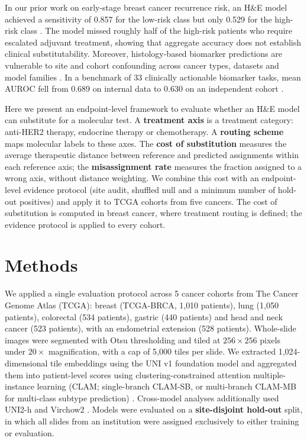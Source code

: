\documentclass[a4paper,10pt,twocolumn]{extarticle}
\begin{document}
In our prior work on early-stage breast cancer recurrence risk, an H\&E model achieved a sensitivity of 0.857 for the low-risk class but only 0.529 for the high-risk class \cite{lee2025}. The model missed roughly half of the high-risk patients who require escalated adjuvant treatment, showing that aggregate accuracy does not establish clinical substitutability. Moreover, histology-based biomarker predictions are vulnerable to site and cohort confounding across cancer types, datasets and model families \cite{dawood2026}. In a benchmark of 33 clinically actionable biomarker tasks, mean AUROC fell from 0.689 on internal data to 0.630 on an independent cohort \cite{goldmark2026}.

Here we present an endpoint-level framework to evaluate whether an H\&E model can substitute for a molecular test. A \textbf{treatment axis} is a treatment category: anti-HER2 therapy, endocrine therapy or chemotherapy. A \textbf{routing scheme} maps molecular labels to these axes. The \textbf{cost of substitution} measures the average therapeutic distance between reference and predicted assignments within each reference axis; the \textbf{misassignment rate} measures the fraction assigned to a wrong axis, without distance weighting. We combine this cost with an endpoint-level evidence protocol (site audit, shuffled null and a minimum number of hold-out positives) and apply it to TCGA cohorts from five cancers. The cost of substitution is computed in breast cancer, where treatment routing is defined; the evidence protocol is applied to every cohort.

\section{Methods}

We applied a single evaluation protocol across 5 cancer cohorts from The Cancer Genome Atlas (TCGA): breast (TCGA-BRCA, 1{,}010 patients), lung (1{,}050 patients), colorectal (534 patients), gastric (440 patients) and head and neck cancer (523 patients), with an endometrial extension (528 patients). Whole-slide images were segmented with Otsu thresholding and tiled at $256\times256$ pixels under $20\times$ magnification, with a cap of 5{,}000 tiles per slide. We extracted 1{,}024-dimensional tile embeddings using the UNI v1 foundation model \cite{chen2024} and aggregated them into patient-level scores using clustering-constrained attention multiple-instance learning (CLAM; single-branch CLAM-SB, or multi-branch CLAM-MB for multi-class subtype prediction) \cite{lu2021}. Cross-model analyses additionally used UNI2-h \cite{chen2024} and Virchow2 \cite{zimmermann2024}. Models were evaluated on a \textbf{site-disjoint hold-out} split, in which all slides from an institution were assigned exclusively to either training or evaluation.
\end{document}
